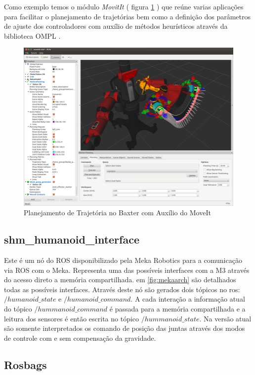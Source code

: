 Como exemplo temos o módulo \textit{MovitIt} ( figura \ref{fig:movit-baxter} ) que reúne varias aplicações para facilitar o planejamento de trajetórias bem como a definição dos parâmetros de ajuste dos controladores com auxílio de métodos heurísticos através da biblioteca OMPL \cite{openMPL}.

\begin{figure}[H]
    \centering
    \includegraphics[width=0.7\linewidth]{tex/figs/movit-ros-baxter.png}
    \caption{Planejamento de Trajetória no Baxter com Auxílio do MoveIt \cite{coleman2014reducing}}
    \label{fig:movit-baxter}
\end{figure}

\subsection{shm\_humanoid\_interface}

Este é um nó do ROS disponibilizado pela Meka Robotics para a comunicação via ROS com o Meka. Representa uma das possíveis interfaces com a M3 através do acesso direto a memória compartilhada. em \ref{fig:mekaarch} são detalhados todas as possíveis interfaces. Através deste nó são gerados dois tópicos no ros: $/humanoid\_state$ e $/humanoid\_command$. A cada interação a informação atual do tópico $/hummanoid\_command$ é passada para a memória compartilhada e a leitura dos sensores é então escrita no tópico $/hummanoid\_state$. Na versão atual são somente interpretados os comando de posição das juntas através dos modos de controle com e sem compensação da gravidade.

\subsection{Rosbags}

